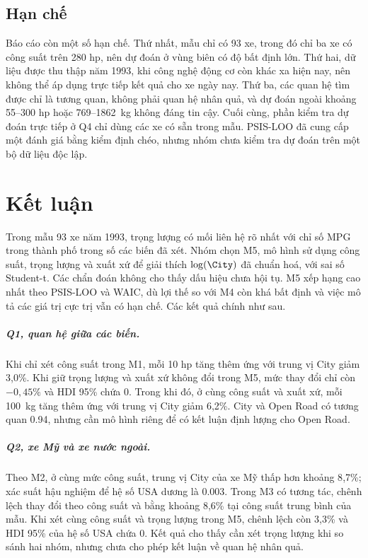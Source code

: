 \documentclass[12pt,a4paper]{report}
\begin{document}

\section{Hạn chế}
\label{sec:limits}

Báo cáo còn một số hạn chế. Thứ nhất, mẫu chỉ có 93 xe, trong đó chỉ ba xe có
công suất trên 280 hp, nên dự đoán ở vùng biên có độ bất định lớn. Thứ hai, dữ
liệu được thu thập năm 1993, khi công nghệ động cơ còn khác xa hiện nay, nên
không thể áp dụng trực tiếp kết quả cho xe ngày nay. Thứ ba, các quan hệ tìm
được chỉ là tương quan, không phải quan hệ nhân quả, và dự đoán ngoài khoảng
55--300 hp hoặc 769--\SI{1862}{kg} không đáng tin cậy. Cuối cùng, phần kiểm tra
dự đoán trực tiếp ở Q4 chỉ dùng các xe có sẵn trong mẫu. PSIS-LOO đã cung cấp
một đánh giá bằng kiểm định chéo, nhưng nhóm chưa kiểm tra dự đoán trên một
bộ dữ liệu độc lập.

\chapter{Kết luận}
\label{sec:conclusion}

Trong mẫu 93 xe năm 1993, trọng lượng có mối liên hệ rõ nhất với chỉ số MPG
trong thành phố trong số các biến đã xét. Nhóm chọn M5, mô hình sử dụng công
suất, trọng lượng và xuất xứ để giải thích $\log(\City)$ đã chuẩn hoá, với sai
số Student-t. Các chẩn đoán không cho thấy dấu hiệu chưa hội tụ. M5 xếp hạng
cao nhất theo PSIS-LOO và WAIC, dù lợi thế so với M4 còn khá bất định và việc
mô tả các giá trị cực trị vẫn có hạn chế. Các kết quả chính như sau.

\paragraph{Q1, quan hệ giữa các biến.} Khi chỉ xét công suất trong M1, mỗi
10 hp tăng thêm ứng với trung vị City giảm 3{,}0\%. Khi giữ trọng lượng và
xuất xứ không đổi trong M5, mức thay đổi chỉ còn $-0{,}45\%$ và HDI 95\% chứa
0. Trong khi đó, ở cùng công suất và xuất xứ, mỗi \SI{100}{kg} tăng thêm ứng
với trung vị City giảm 6{,}2\%. City và Open Road có tương quan \num{0.94},
nhưng cần mô hình riêng để có kết luận định lượng cho Open Road.

\paragraph{Q2, xe Mỹ và xe nước ngoài.} Theo M2, ở cùng mức công suất, trung
vị City của xe Mỹ thấp hơn khoảng 8{,}7\%; xác suất hậu nghiệm để hệ số USA
dương là \num{0.003}. Trong M3 có tương tác, chênh lệch thay đổi theo công
suất và bằng khoảng 8{,}6\% tại công suất trung bình của mẫu. Khi xét cùng
công suất và trọng lượng trong M5, chênh lệch còn 3{,}3\% và HDI 95\% của hệ
số USA chứa 0. Kết quả cho thấy cần xét trọng lượng khi so sánh hai nhóm, nhưng
chưa cho phép kết luận về quan hệ nhân quả.
\end{document}

